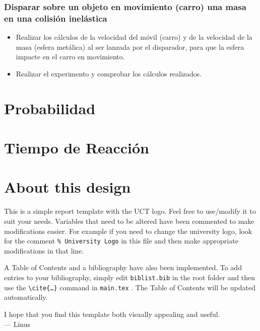 \documentclass[12pt]{article}
\begin{document}
\subsubsection{Disparar sobre un objeto en movimiento (carro) una masa en una colisión inelástica}

\begin{itemize}
    \item Realizar los cálculos de la velocidad del móvil (carro) y de la velocidad de la masa (esfera metálica) al ser lanzada por el disparador, para que la esfera impacte en el carro en movimiento.
    \item Realizar el experimento y comprobar los cálculos realizados.
\end{itemize}



\newpage


\appendix

\section{Probabilidad}
\label{prob}

\section{Tiempo de Reacción}
\label{t_recc}

\section{About this design}
This is a simple report template with the UCT logo. Feel free to use/modify it to suit your needs. Variables that need to be altered have been commented to make modifications easier. For example if you need to change the university logo, look for the comment \texttt{\% University Logo} in this file and then make appropriate modifications in that line.

A Table of Contents and a bibliography have also been implemented. To add entries to your bibliography, simply edit \texttt{biblist.bib} in the root folder and then use the \texttt{\textbackslash cite\{\ldots\}} command in \texttt{main.tex} \cite{bibtex}. The Table of Contents will be updated automatically.

I hope that you find this template both visually appealing and useful. \\

\hspace{1 cm}--- Linus

\newpage





\newpage






\end{document}
